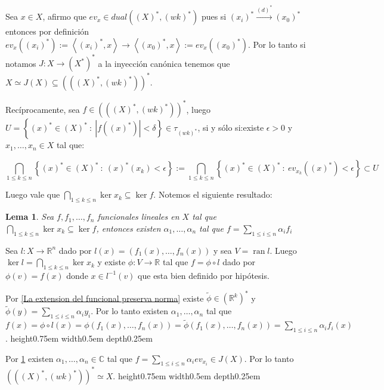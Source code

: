 \documentclass[11pt]{article}
\newcommand{\C}{\mathbb{C}}
\newcommand{\R}{{\mathbb{R}}}
\newcommand\tq{~:~}
\newcommand{\dual}[1]{\left(#1\right)^{\ast}}
\newcommand{\ddual}[1]{\left(#1^{\ast}\right)^{\ast}}
\newcommand{\abs}[1]{\left\lvert#1\right\rvert}
\newcommand{\ip}[1]{\left\langle#1\right\rangle}
\newcommand{\sett}[1]{\left\lbrace#1\right\rbrace}
\newcommand{\Bigcap}[2]{\bigcap\limits_{#1}{#2}}
\newcommand{\Bigsum}[2]{\sum\limits_{#1}{#2}}
\DeclareMathOperator{\rank}{ran}
\numberwithin{theorem}{subsection}
\newtheorem{lemma}[theorem]{Lema}
\newenvironment{proof}[1][Demostraci\'on]{\begin{trivlist}
		\item[\hskip \labelsep {\bfseries #1}]}{\end{trivlist}}
\newcommand{\qed}{\nobreak \ifvmode \relax \else
	\ifdim\lastskip<1.5em \hskip-\lastskip
	\hskip1.5em plus0em minus0.5em \fi \nobreak
	\vrule height0.75em width0.5em depth0.25em\fi}
\begin{document}
\begin{proof}
	Sea $x \in X$, afirmo que $ev_x \in dual{(\dual{X}, \dual{wk})}$ pues si $\dual{x_i} \xrightarrow{\dual{d}} \dual{x_0}$ entonces por definici\'on $ev_x (\dual{x_i}) := \ip{\dual{x_i}, x} \rightarrow \ip{\dual{x_0}, x} := ev_x(\dual{x_0})$. Por lo tanto si notamos $J:X \rightarrow \ddual{X}$ a la inyecci\'on can\'onica tenemos que $X \simeq J(X) \subseteq \dual{(\dual{X}, \dual{wk})}$.
	
	Rec\'iprocamente, sea $f \in \dual{(\dual{X}, \dual{wk})}$, luego $U = \sett{\dual{x} \in \dual{X} \tq \abs{f(\dual{x})} < \delta} \in \tau_{\dual{wk}}$, si y s\'olo si:existe $\epsilon > 0$ y $x_1 , \dots, x_n \in X$ tal que:
	
	\begin{equation*}
	\Bigcap{1 \leq k \leq n}{\sett{\dual{x} \in \dual{X} \tq \dual{x}(x_k) < \epsilon}} := \Bigcap{1 \leq k \leq n}{\sett{\dual{x} \in \dual{X} \tq ev_{x_k}(\dual{x}) < \epsilon}}  \subset U
	\end{equation*}
	
	Luego vale que $\Bigcap{1 \leq k \leq n}{\ker x_k} \subseteq \ker f$. Notemos el siguiente resultado:
	
	
	
	\begin{lemma}
		\label{Lemma: El dual a la topologia debil estrella es X}
		Sea $f, f_1, \dots, f_n$ funcionales lineales en $X$ tal que $\Bigcap{1 \leq k \leq n}{\ker x_k} \subseteq \ker f$, entonces existen $\alpha_1, \dots, \alpha_n$ tal que $f = \Bigsum{1 \leq i \leq n}{\alpha_i f_i}$
	\end{lemma}
	
	
	
	\begin{proof}[Demostraci\'on del lema]
		Sea $l : X \rightarrow \R^n$ dado por $l(x) = \left(f_1(x), \dots, f_n(x)\right)$ y  sea $V = \rank l$. Luego $\ker l = \Bigcap{1 \leq k \leq n}{\ker x_k} $ y existe $\phi : V \rightarrow \R$ tal que $f = \phi \circ l$ dado por $\phi(v) = f(x)$ donde $x \in l^{-1}(v)$ que esta bien definido por hip\'otesis.
		
		Por \ref{La extension del funcional preserva norma} existe $\tilde{\phi} \in \dual{\R^k}$ y $\tilde{\phi}(y) = \Bigsum{1 \leq i \leq n}{\alpha_i y_i}$. Por lo tanto existen $\alpha_1 , \dots , \alpha_n$ tal que $f(x) = \phi \circ l (x) = \phi \left(f_1(x), \dots, f_n(x)\right) = \tilde{\phi} \left(f_1(x), \dots, f_n(x)\right) = \Bigsum{1 \leq i \leq n}{\alpha_i f_i(x)}$. \qed
		
	\end{proof}
	
	
	
	Por \ref{Lemma: El dual a la topologia debil estrella es X} existen $\alpha_1 , \dots, \alpha_n \in \C$ tal que $f = \Bigsum{1 \leq i \leq n}{\alpha_i ev_{x_i}} \in J(X)$. Por lo tanto $\dual{(\dual{X}, \dual{wk})} \simeq X$. \qed
	
\end{proof}
\end{document}
